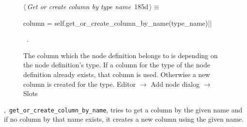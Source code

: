 \documentclass[%
    a4paper,    %
    justified,  %
    nobib,      %
    openany     %
]{tufte-book}
\makeatletter
\renewcommand{\label}[1]{\@tufte@label{##1}}%
\makeatother
\begin{document}
\begin{figure}[!htbp]
\begin{flushleft} \small
\begin{minipage}{\linewidth}\label{scrap162}\raggedright\small
{} $\langle\,${\itshape Get or create column by type name}\nobreak\ {\footnotesize {185d}}$\,\rangle\equiv$
\vspace{-1ex}
\begin{pythoncode}
    column = self.get_or_create_column_by_name(type_name)|\NWsep|
\end{pythoncode}
\vspace{1.5ex}
\footnotesize
\begin{list}{}{\setlength{\itemsep}{-\parsep}\setlength{\itemindent}{-\leftmargin}}
\item \NWtxtMacroRefIn\ .

\item{}
\end{list}
\end{minipage}\vspace{4ex}
\end{flushleft}
\caption{The column which the node definition belongs to is depending on the
  node definition's type. If a column for the type of the node definition
  already exists, that column is used. Otherwise a new column is created for the
  type.
  \newline{}\newline{}Editor $\rightarrow$ Add node dialog $\rightarrow$ Slots}
\end{figure}

,~\verb=get_or_create_column_by_name=,
tries to get a column by the given name and if no column by that name exists, it
creates a new column using the given name.
\end{document}
